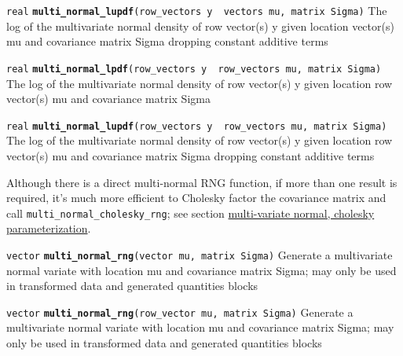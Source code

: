 \documentclass[
  10pt,
]{book}
\begin{document}
\texttt{real} \textbf{\texttt{multi\_normal\_lupdf}}\texttt{(row\_vectors\ y\ \textbar{}\ vectors\ mu,\ matrix\ Sigma)}\newline
The log of the multivariate normal density of row vector(s) y given
location vector(s) mu and covariance matrix Sigma dropping constant additive
terms


\texttt{real} \textbf{\texttt{multi\_normal\_lpdf}}\texttt{(row\_vectors\ y\ \textbar{}\ row\_vectors\ mu,\ matrix\ Sigma)}\newline
The log of the multivariate normal density of row vector(s) y given
location row vector(s) mu and covariance matrix Sigma


\texttt{real} \textbf{\texttt{multi\_normal\_lupdf}}\texttt{(row\_vectors\ y\ \textbar{}\ row\_vectors\ mu,\ matrix\ Sigma)}\newline
The log of the multivariate normal density of row vector(s) y given
location row vector(s) mu and covariance matrix Sigma dropping constant additive
terms

Although there is a direct multi-normal RNG function, if more than one
result is required, it's much more efficient to Cholesky factor the
covariance matrix and call \texttt{multi\_normal\_cholesky\_rng}; see section
\protect\hyperlink{multi-normal-cholesky-fun}{multi-variate normal, cholesky parameterization}.


\texttt{vector} \textbf{\texttt{multi\_normal\_rng}}\texttt{(vector\ mu,\ matrix\ Sigma)}\newline
Generate a multivariate normal variate with location mu and covariance
matrix Sigma; may only be used in transformed data and generated quantities blocks


\texttt{vector} \textbf{\texttt{multi\_normal\_rng}}\texttt{(row\_vector\ mu,\ matrix\ Sigma)}\newline
Generate a multivariate normal variate with location mu and covariance
matrix Sigma; may only be used in transformed data and generated quantities blocks
\end{document}

